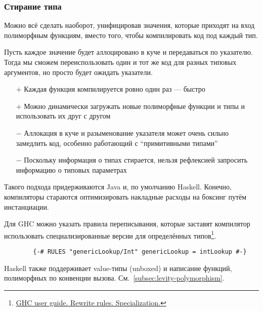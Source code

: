 \documentclass[12pt]{article}
\newcommand{\positive}{$+$} %
\newcommand{\negative}{{\color{red} $-$}} %
\begin{document}
    \subsubsection{Стирание типа} \label{subsubsec:type-erasure}

    Можно всё сделать наоборот, унифицировав значения, которые приходят на вход полиморфным функциям, вместо того, чтобы компилировать код под каждый тип.

    Пусть каждое значение будет аллоцировано в куче и передаваться по указателю.
    Тогда мы сможем переиспользовать один и тот же код для разных типовых аргументов, но просто будет ожидать указатели.

    \begin{itemize}
        \item[\positive] Каждая функция компилируется ровно один раз --- быстро
        \item[\positive] Можно динамически загружать новые полиморфные функции и типы и использовать их друг с другом
        \item[\negative] Аллокация в куче и разыменование указателя может очень сильно замедлить код, особенно работающий с ``примитивными типами''
        \item[\negative] Поскольку информация о типах стирается, нельзя рефлексией запросить информацию о типовых параметрах
    \end{itemize}

    Такого подхода придерживаются Java и, по умолчанию Haskell.
    Конечно, компиляторы стараются оптимизировать накладные расходы на боксинг путём инстанциации.

    Для GHC можно указать правила переписывания, которые заставят компилятор использовать специализированные версии для определённых типов\footnote{\href{https://downloads.haskell.org/~ghc/6.12.2/docs/html/users\_guide/rewrite-rules.html\#rule-spec}{GHC user guide. Rewrite rules. Specialization.}}.
    \begin{verbatim}
        {-# RULES "genericLookup/Int" genericLookup = intLookup #-}
    \end{verbatim}


    Haskell также поддерживает value-типы (unboxed) и написание функций, полиморфных по конвенции вызова.
    См.~\ref{subsec:levity-polymorphism}.

\end{document}
